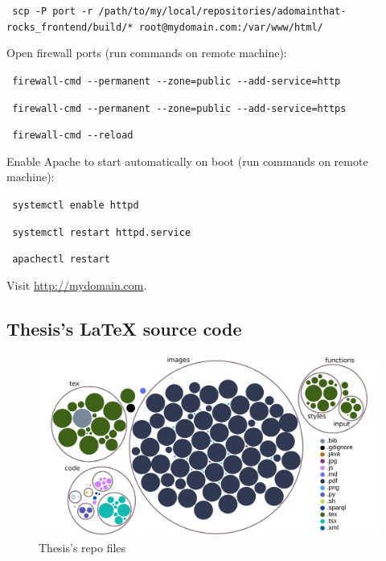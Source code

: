 \noindent\colorbox{lightestgray}{
	\parbox{1\linewidth-9pt}{%
		\texttt{\tiny\faDollarSign\large\ scp -P port -r /path/to/my/local/repositories/adomainthat-rocks\_frontend/build/* root@mydomain.com:/var/www/html/}
	}%
}%

\medskip

\noindent Open firewall ports (run commands on remote machine):

\noindent\colorbox{lightestgray}{
	\parbox{1\linewidth-9pt}{%
		\texttt{\tiny\faHashtag\large\ firewall-cmd -{}-permanent -{}-zone=public -{}-add-service=http}
	}%
}%

\noindent\colorbox{lightestgray}{
	\parbox{1\linewidth-9pt}{%
		\texttt{\tiny\faHashtag\large\ firewall-cmd -{}-permanent -{}-zone=public -{}-add-service=https}
	}%
}%

\noindent\colorbox{lightestgray}{
	\parbox{1\linewidth-9pt}{%
		\texttt{\tiny\faHashtag\large\ firewall-cmd -{}-reload}
	}%
}%

\medskip

\noindent Enable Apache to start automatically on boot (run commands on remote machine):

\noindent\colorbox{lightestgray}{
	\parbox{1\linewidth-9pt}{%
		\texttt{\tiny\faHashtag\large\ systemctl enable httpd}
	}%
}%

\noindent\colorbox{lightestgray}{
	\parbox{1\linewidth-9pt}{%
		\texttt{\tiny\faHashtag\large\ systemctl restart httpd.service}
	}%
}%

\noindent\colorbox{lightestgray}{
	\parbox{1\linewidth-9pt}{%
		\texttt{\tiny\faHashtag\large\ apachectl restart}
	}%
}%

\medskip

\noindent Visit \url{http://mydomain.com}.

\subsection{Thesis's \LaTeX{} source code} \label{subsection:SourceCode/Instructionshowtorunbuildanddeploy/ThesissLatexsourcecode}
\begin{figure}[H]%
	\centering%
	\includegraphics[width=1\textwidth]{images/appendixA/sourcecodethesisnew.pdf}%
	\caption[Thesis's repo files]{Thesis's repo files}%
	\label{fig:sourcecodethesisnew}%
\end{figure}%

